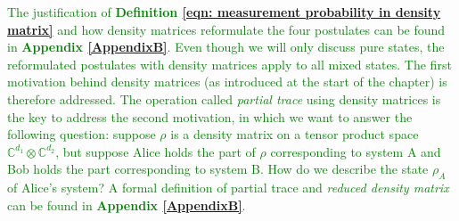 \textcolor{green}{The justification of \textbf{Definition \ref{eqn: measurement probability in density matrix}} and how density matrices reformulate the four postulates can be found in \textbf{Appendix \ref{AppendixB}}. Even though we will only discuss pure states, the reformulated postulates with density matrices apply to all mixed states. The first motivation behind density matrices (as introduced at the start of the chapter) is therefore addressed. The operation called \textit{partial trace} using density matrices is the key to address the second motivation, in which we want to answer the following question: suppose $\rho$ is a density matrix on a tensor product space $\mathbb{C}^{d_1} \otimes \mathbb{C}^{d_2}$, but suppose Alice holds the part of $\rho$ corresponding to system A and Bob holds the part corresponding to system B. How do we describe the state $\rho_A$ of Alice's system? A formal definition of partial trace and \textit{reduced density matrix} can be found in \textbf{Appendix \ref{AppendixB}}.
}




